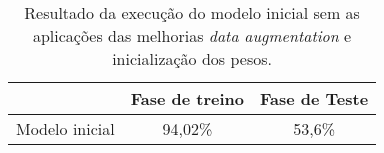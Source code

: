 \begin{table}[H]
    \centering
    \caption{Resultado da execução do modelo inicial sem as aplicações das melhorias \textit{data augmentation} e inicialização dos pesos.
    \label{tab:resultado1}}
    \begin{tabular}{ccc}
        \toprule
              & Fase de treino & Fase de Teste \\
        \midrule
            Modelo inicial & 94,02\% & 53,6\%  \\
        \bottomrule
    \end{tabular}
\end{table}
